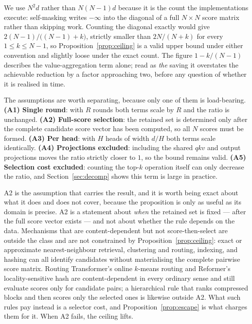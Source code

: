 We use $N^2d$ rather than $N(N{-}1)d$ because it is the count the
implementations execute: self-masking writes $-\infty$ into the diagonal of a
full $N \times N$ score matrix rather than skipping work. Counting the diagonal
exactly would give $2(N{-}1)/\bigl((N{-}1)+k\bigr)$, strictly smaller than
$2N/(N+k)$ for every $1 \le k \le N-1$, so Proposition~\ref{prop:ceiling} is a
valid upper bound under either convention and slightly loose under the exact
count. The figure $1 - k/(N-1)$ describes the value-aggregation term alone; read
as \emph{the} saving it overstates the achievable reduction by a factor
approaching two, before any question of whether it is realised in time.

The assumptions are worth separating, because only one of them is
load-bearing. \textbf{(A1) Single round}: with $R$ rounds both terms scale by
$R$ and the ratio is unchanged. \textbf{(A2) Full-score selection}: the
retained set is determined only after the complete candidate score vector has
been computed, so all $N$ scores must be formed.
\textbf{(A3) Per head}: with $H$ heads of width $d/H$ both terms scale
identically. \textbf{(A4) Projections excluded}: including the shared $qkv$ and
output projections moves the ratio strictly closer to $1$, so the bound
remains valid. \textbf{(A5) Selection cost excluded}: counting the top-$k$
operation itself can only decrease the ratio, and Section~\ref{sec:decomp}
shows this term is large in practice.

A2 is the assumption that carries the result, and it is worth being exact about
what it does and does not cover, because the proposition is only as useful as
its domain is precise. A2 is a statement about \emph{when} the retained set is
fixed --- after the full score vector exists --- and not about whether the rule
depends on the data. Mechanisms that are content-dependent but not
score-then-select are outside the class and are not constrained by
Proposition~\ref{prop:ceiling}: exact or approximate nearest-neighbour
retrieval, clustering and routing, indexing, and hashing can all identify
candidates without materialising the complete pairwise score matrix. Routing
Transformer's online $k$-means routing \citep{roy2021routing} and Reformer's
locality-sensitive hash \citep{kitaev2020reformer} are content-dependent in
every ordinary sense and still evaluate scores only for candidate pairs; a
hierarchical rule that ranks compressed blocks and then scores only the
selected ones \citep{yuan2025nsa} is likewise outside A2. What such rules pay
instead is a selector cost, and Proposition~\ref{prop:escape} is what charges
them for it. When A2 fails, the ceiling lifts.

